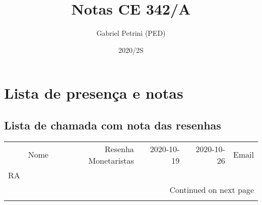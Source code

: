 \documentclass[11pt]{article}
\author{Gabriel Petrini (PED)}
\date{2020/2S}
\title{Notas CE 342/A}
\begin{document}
\maketitle

\section{Lista de presença e notas}
\label{sec:org5f88641}
\subsection{Lista de chamada com nota das resenhas}
\label{sec:org5258559}
\small{\begin{landscape}
\begin{longtable}{llrrrl}
\toprule
{} &                                  Nome &  Resenha Monetaristas &  2020-10-19 &  2020-10-26 &                   Email \\
RA     &                                       &                       &             &             &                         \\
\midrule
\endhead
\midrule
\multicolumn{6}{r}{{Continued on next page}} \\
\midrule
\endfoot


\end{longtable}
\end{landscape}}
\end{document}
